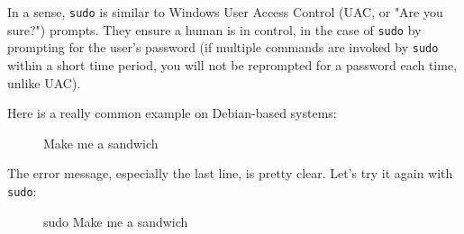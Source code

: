 \documentclass[10pt,american,]{book}
\newenvironment{Shaded}{\begin{snugshade}}{\end{snugshade}}
\newcommand{\KeywordTok}[1]{\textcolor[rgb]{0.13,0.29,0.53}{\textbf{{#1}}}}
\newcommand{\NormalTok}[1]{{#1}}
\numberwithin{figure}{chapter}
\DeclareRobustCommand{\drcap}[1]{\begin{figure}[H]\caption{#1}\end{figure}}
\renewcommand{\KeywordTok}[1]{{#1}}
\renewcommand{\NormalTok}[1]{{#1}}
\begin{document}
In a sense, \texttt{sudo} is similar to Windows User Access Control
(UAC, or "Are you sure?") prompts. They ensure a human is in control, in
the case of \texttt{sudo} by prompting for the user's password (if
multiple commands are invoked by \texttt{sudo} within a short time
period, you will not be reprompted for a password each time, unlike
UAC).

Here is a really common example on Debian-based systems:

\drcap{Make me a sandwich}

\begin{Shaded}
\end{Shaded}

The error message, especially the last line, is pretty clear. Let's try
it again with \texttt{sudo}:

\drcap{sudo Make me a sandwich}
\end{document}
